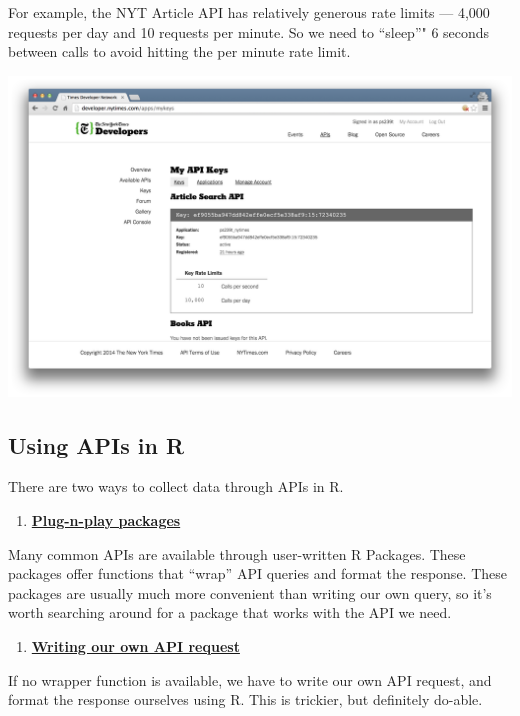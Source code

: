 \documentclass[]{book}
\providecommand{\tightlist}{%
  \setlength{\itemsep}{0pt}\setlength{\parskip}{0pt}}
\begin{document}
For example, the NYT Article API has relatively generous rate limits --- 4,000 requests per day and 10 requests per minute. So we need to ``sleep''" 6 seconds between calls to avoid hitting the per minute rate limit.

\begin{center}\includegraphics[width=0.7\linewidth]{img/nytimes_key} \end{center}

\hypertarget{using-apis-in-r}{%
\subsection{Using APIs in R}\label{using-apis-in-r}}

There are two ways to collect data through APIs in R.

\begin{enumerate}
\def\labelenumi{\arabic{enumi}.}
\tightlist
\item
  \protect\hyperlink{collecting-twitter-data-with-rtweet}{\textbf{Plug-n-play packages}}
\end{enumerate}

Many common APIs are available through user-written R Packages. These packages offer functions that ``wrap'' API queries and format the response. These packages are usually much more convenient than writing our own query, so it's worth searching around for a package that works with the API we need.

\begin{enumerate}
\def\labelenumi{\arabic{enumi}.}
\setcounter{enumi}{1}
\tightlist
\item
  \protect\hyperlink{writing-api-queries}{\textbf{Writing our own API request}}
\end{enumerate}

If no wrapper function is available, we have to write our own API request, and format the response ourselves using R. This is trickier, but definitely do-able.
\end{document}
